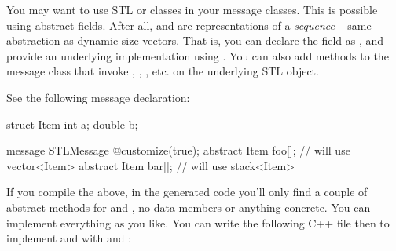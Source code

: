 

You may want to use STL  or  classes in your message classes.
This is possible using abstract fields. After all,  and 
are representations of a \textit{sequence} -- same abstraction as dynamic-size vectors.
That is, you can declare the field as , and provide
an underlying implementation using . You can also add methods
to the message class that invoke , , , etc.
on the underlying STL object.

See the following message declaration:

\begin{msg}
struct Item
{
    int a;
    double b;
}

message STLMessage
{
   @customize(true);
   abstract Item foo[]; // will use vector<Item>
   abstract Item bar[]; // will use stack<Item>
}
\end{msg}

If you compile the above, in the generated code you'll only find a couple of
abstract methods for  and , no data members or anything concrete.
You can implement everything as you like. You can write the following C++ file
then to implement  and  with  and :

